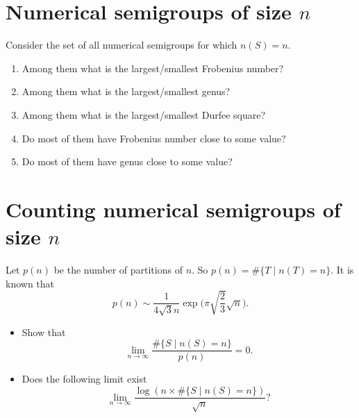 \documentclass{article}
\theoremstyle{definition}
\theoremstyle{definition}
\theoremstyle{definition}
\begin{document}
\section{Numerical semigroups of size $n$}
Consider the set of all numerical semigroups for which $n(S)=n$.
\begin{enumerate}
    \item Among them what is the largest/smallest Frobenius number?
    \item Among them what is the largest/smallest genus?
    \item Among them what is the largest/smallest Durfee square?
    \item Do most of them have Frobenius number close to some value?
    \item Do most of them have genus close to some value?
\end{enumerate}


\section{Counting numerical semigroups of size $n$}
Let $p(n)$ be the number of partitions of $n$. So $p(n)=\#\{T\mid n(T)=n\}$. It is known that
\[p(n)\sim \frac{1}{4\sqrt{3} n}\exp\Big(\pi\sqrt{\frac{2}{3}}\sqrt{n}\Big).\]

\begin{itemize}
    \item Show that
    \[\lim_{n\to\infty} \frac{\#\{S\mid n(S)=n\}}{p(n)}=0.\]
    \item Does the following limit exist
    \[\lim_{n\to\infty} \frac{\log(n\times \#\{S\mid n(S)=n\})}{\sqrt{n}}?\]
\end{itemize}
\end{document}
